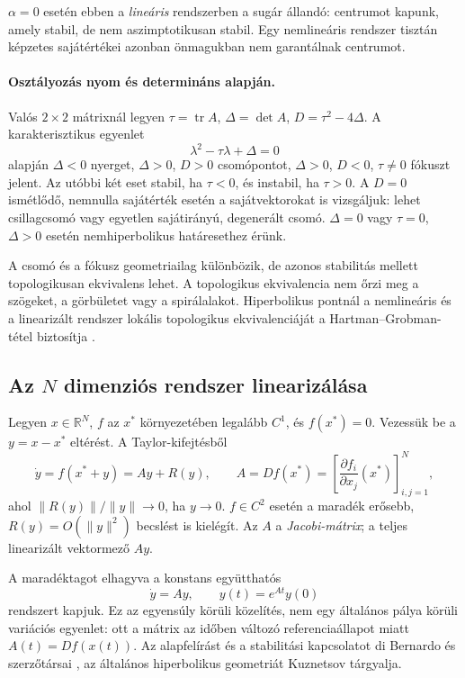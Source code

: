 $\alpha=0$ esetén ebben a \emph{lineáris} rendszerben a sugár állandó: centrumot kapunk, amely stabil, de nem aszimptotikusan stabil. Egy nemlineáris rendszer tisztán képzetes sajátértékei azonban önmagukban nem garantálnak centrumot.

\paragraph*{Osztályozás nyom és determináns alapján.}
Valós $2\times2$ mátrixnál legyen $\tau=\operatorname{tr}A$, $\Delta=\det A$, $D=\tau^2-4\Delta$. A karakterisztikus egyenlet
\[
\lambda^2-\tau\lambda+\Delta=0
\]
alapján $\Delta<0$ nyerget, $\Delta>0$, $D>0$ csomópontot, $\Delta>0$, $D<0$, $\tau\neq0$ fókuszt jelent. Az utóbbi két eset stabil, ha $\tau<0$, és instabil, ha $\tau>0$. A $D=0$ ismétlődő, nemnulla sajátérték esetén a sajátvektorokat is vizsgáljuk: lehet csillagcsomó vagy egyetlen sajátirányú, degenerált csomó. $\Delta=0$ vagy $\tau=0$, $\Delta>0$ esetén nemhiperbolikus határesethez érünk.

A csomó és a fókusz geometriailag különbözik, de azonos stabilitás mellett topologikusan ekvivalens lehet. A topologikus ekvivalencia nem őrzi meg a szögeket, a görbületet vagy a spirálalakot. Hiperbolikus pontnál a nemlineáris és a linearizált rendszer lokális topologikus ekvivalenciáját a Hartman--Grobman-tétel biztosítja \cite[2.1.4. szakasz, 2.2. tétel]{dib}.

\FloatBarrier
\subsection{Az $N$ dimenziós rendszer linearizálása}
Legyen $x\in\mathbb R^N$, $f$ az $x^*$ környezetében legalább $C^1$, és $f(x^*)=0$. Vezessük be a $y=x-x^*$ eltérést. A Taylor-kifejtésből
\begin{equation}\label{eq:equilibrium_linearization_N}
\dot y=f(x^*+y)=Ay+R(y),\qquad
A=Df(x^*)=\left[\frac{\partial f_i}{\partial x_j}(x^*)\right]_{i,j=1}^{N},
\end{equation}
ahol $\|R(y)\|/\|y\|\to0$, ha $y\to0$. $f\in C^2$ esetén a maradék erősebb, $R(y)=O(\|y\|^2)$ becslést is kielégít. Az $A$ a \emph{Jacobi-mátrix}; a teljes linearizált vektormező $Ay$.

A maradéktagot elhagyva a konstans együtthatós
\begin{equation}\label{eq:linear_solution_N}
\dot y=Ay,\qquad y(t)=e^{At}y(0)
\end{equation}
rendszert kapjuk. Ez az egyensúly körüli közelítés, nem egy általános pálya körüli variációs egyenlet: ott a mátrix az időben változó referenciaállapot miatt $A(t)=Df(x(t))$. Az alapfelírást és a stabilitási kapcsolatot di Bernardo és szerzőtársai \cite[2.1.3--2.1.4. szakasz]{dib}, az általános hiperbolikus geometriát Kuznetsov \cite[2.2.1. szakasz]{kuznetsov_book} tárgyalja.

